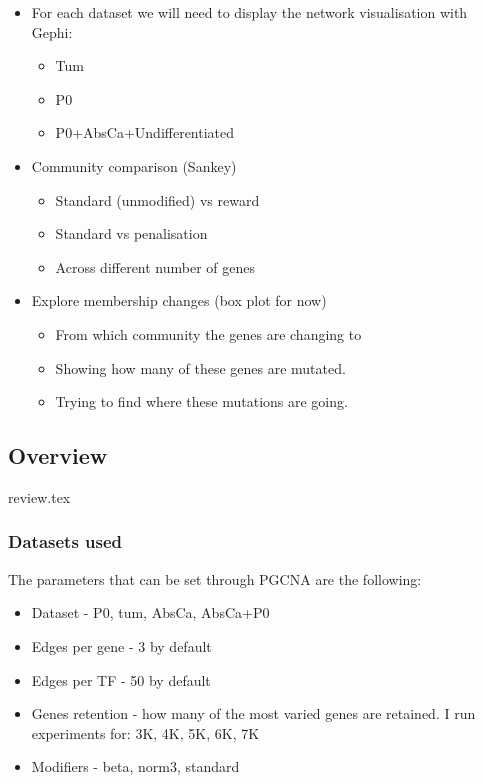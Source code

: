 \begin{itemize}
    \item For each dataset we will need to display the network visualisation with Gephi:
          \begin{itemize}
              \item Tum
              \item P0
              \item P0+AbsCa+Undifferentiated
          \end{itemize}
\end{itemize}

\begin{itemize}
    \item Community comparison (Sankey)
          \begin{itemize}
              \item Standard (unmodified) vs reward
              \item Standard vs penalisation
              \item Across different number of genes
          \end{itemize}
\end{itemize}

\begin{itemize}
    \item Explore membership changes (box plot \- for now)
          \begin{itemize}
              \item From which community the genes are changing to
              \item Showing how many of these genes are mutated.
              \item Trying to find where these mutations are going.
          \end{itemize}
\end{itemize}


\subsection{Overview}


{review.tex}


\subsubsection{Datasets used}


The parameters that can be set through PGCNA are the following:
\begin{itemize}
    \item Dataset - P0, tum, AbsCa, AbsCa+P0
    \item Edges per gene - 3 by default
    \item Edges per TF - 50 by default
    \item Genes retention - how many of the most varied genes are retained. I run experiments for: 3K, 4K, 5K, 6K, 7K
    \item Modifiers - beta, norm3, standard
\end{itemize}


